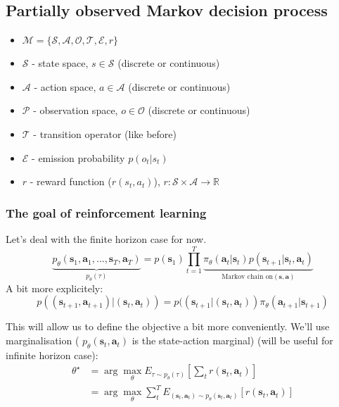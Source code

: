 \documentclass{report}
\newcommand{\argmax}{\arg\!\max}
\begin{document}
\subsection{Partially observed Markov decision process}
\begin{itemize}
		\item $\mathcal{M} = \{\mathcal{S}, \mathcal{A}, \mathcal{O}, \mathcal{T}, \mathcal{E}, r\}$
\item $\mathcal{S}$ - state space, $s \in \mathcal{S}$ (discrete or continuous)
\item $\mathcal{A}$ - action space, $a \in \mathcal{A}$ (discrete or continuous)
\item $\mathcal{P}$ - observation space, $o \in \mathcal{O}$ (discrete or continuous)
\item $\mathcal{T}$ - transition operator (like before)
\item $\mathcal{E}$ - emission probability $p(o_t|s_t)$
\item $r$ - reward function ($r(s_t, a_t)$), $r : \mathcal{S} \times \mathcal{A} \to \mathbb{R}$
\end{itemize}

\subsubsection{The goal of reinforcement learning}
Let's deal with the finite horizon case for now.
\begin{equation}
\underbrace{p_\theta(\bm{s}_1, \bm{a}_1, \dots, \bm{s}_T, \bm{a}_T)}_{p_\theta(\tau)} = p(\bm{s}_1) \prod^{T}_{t=1} 
\underbrace{\pi_{\theta} (\bm{a}_t | \bm{s}_t) p (\bm{s}_{t+1} | \bm{s}_t, \bm{a}_t)}_{\text{Markov chain on} (\bm{s}, \bm{a})}
\end{equation}
A bit more explicitely:
\begin{equation}
p((\bm{s}_{t+1}, \bm{a}_{t+1}) | (\bm{s}_t, \bm{a}_t)) = 
p((\bm{s}_{t+1}| (\bm{s}_t, \bm{a}_t)) \pi_\theta (\bm{a}_{t+1} | \bm{s}_{t+1})
\end{equation}

This will allow us to define the objective a bit more conveniently.
We'll use marginalisation ( $p_\theta (\bm{s}_t, \bm{a}_t)$ is the state-action marginal) (will be useful for infinite horizon case):
\begin{align}
		\theta^\star &= \argmax_{\theta} E_{\tau \sim p_\theta(\tau)} \left[ \sum_{t}^{} r(\bm{s}_t, \bm{a}_t) \right] \\
	 &= \argmax_{\theta} \sum_{t}^{T} E_{(\bm{s}_t, \bm{a}_t) \sim p_\theta(\bm{s}_t, \bm{a}_t)} \left[  r(\bm{s}_t, \bm{a}_t) \right]
\end{align}
\end{document}
